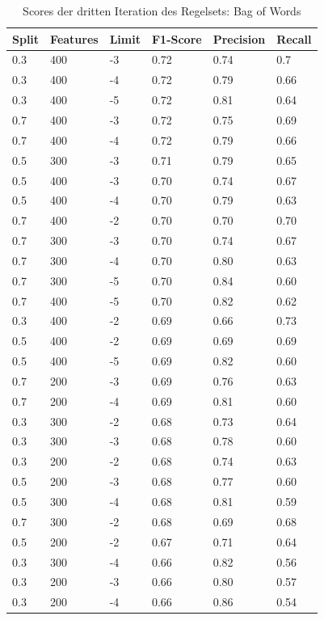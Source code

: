 \begin{table}
	\caption{Scores der dritten Iteration des Regelsets: Bag of Words}
	\centering
	\label{tab:bow3}
	\begin{tabular}{ | l | l | l | l | l | l | }
		\hline
		Split & Features & Limit & F1-Score & Precision & Recall \\ \hline
		0.3 & 400 & -3 & 0.72 & 0.74 & 0.7 \\ 
		0.3 & 400 & -4 & 0.72 & 0.79 & 0.66 \\
		0.3 & 400 & -5 & 0.72 & 0.81 & 0.64 \\
		0.7 & 400 & -3 & 0.72 & 0.75 & 0.69 \\
		0.7 & 400 & -4 & 0.72 & 0.79 & 0.66 \\
		0.5 & 300 & -3 & 0.71 & 0.79 & 0.65 \\
		0.5 & 400 & -3 & 0.70 & 0.74 & 0.67 \\
		0.5 & 400 & -4 & 0.70 & 0.79 & 0.63 \\ 
		0.7 & 400 & -2 & 0.70 & 0.70 & 0.70 \\ 
		0.7 & 300 & -3 & 0.70 & 0.74 & 0.67 \\
		0.7 & 300 & -4 & 0.70 & 0.80 & 0.63 \\
		0.7 & 300 & -5 & 0.70 & 0.84 & 0.60 \\
		0.7 & 400 & -5 & 0.70 & 0.82 & 0.62 \\ 
		0.3 & 400 & -2 & 0.69 & 0.66 & 0.73 \\ 
		0.5 & 400 & -2 & 0.69 & 0.69 & 0.69 \\ 
		0.5 & 400 & -5 & 0.69 & 0.82 & 0.60 \\ 
		0.7 & 200 & -3 & 0.69 & 0.76 & 0.63 \\ 
		0.7 & 200 & -4 & 0.69 & 0.81 & 0.60 \\ 
		0.3 & 300 & -2 & 0.68 & 0.73 & 0.64 \\ 
		0.3 & 300 & -3 & 0.68 & 0.78 & 0.60 \\ 
		0.3 & 200 & -2 & 0.68 & 0.74 & 0.63 \\ 
		0.5 & 200 & -3 & 0.68 & 0.77 & 0.60 \\ 
		0.5 & 300 & -4 & 0.68 & 0.81 & 0.59 \\ 
		0.7 & 300 & -2 & 0.68 & 0.69 & 0.68 \\ 
		0.5 & 200 & -2 & 0.67 & 0.71 & 0.64 \\ 
		0.3 & 300 & -4 & 0.66 & 0.82 & 0.56 \\ 
		0.3 & 200 & -3 & 0.66 & 0.80 & 0.57 \\
		0.3 & 200 & -4 & 0.66 & 0.86 & 0.54 \\

\end{tabular}
\end{table}
